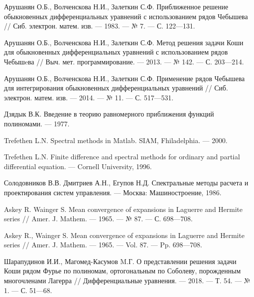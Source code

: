 \begin{thebibliography}{20}
Арушанян О.Б., Волченскова Н.И., Залеткин С.Ф. Приближенное решение обыкновенных дифференциальных уравнений с использованием рядов Чебышева // Сиб. электрон. матем. изв. --- 1983. --- № 7. --- С. 122---131.



Арушанян О.Б., Волченскова Н.И., Залеткин С.Ф. Метод решения задачи Коши для обыкновенных дифференциальных уравнений с использованием рядов Чебышeва // Выч. мет. программирование. --- 2013. --- № 142. --- С. 203---214.



Арушанян О.Б., Волченскова Н.И., Залеткин С.Ф. Применение рядов Чебышева для интегрирования обыкновенных дифференциальных уравнений // Сиб. электрон. матем. изв. --- 2014. --- № 11. --- С. 517---531.



Дзядык В.К. Введение в теорию равномерного приближения функций полиномами. --- 1977.



Trefethen L.N. Spectral methods in Matlab. SIAM, Fhiladelphia. --- 2000.



Trefethen L.N. Finite difference and spectral methods for ordinary and partial differential equation. --- Cornell University, 1996.



Солодовников В.В. Дмитриев А.Н., Егупов Н.Д. Спектральные методы расчета и проектирования систем управления. --- Москва: Машиностроение, 1986.



Askey R. Wainger S. Mean convergence of expansions in Laguerre and Hermite series // Amer. J. Mathem. --- 1965. --- № 87. --- С. 698---708.



Askey R., Wainger S. Mean convergence of expansions in Laguerre and Hermite series // Amer. J. Mathem. --- 1965. --- Vol. 87. --- Pp. 698---708.




Шарапудинов И.И., Магомед-Касумов M.Г. О представлении решения задачи Коши  рядом Фурье  по полиномам, ортогональным по  Соболеву, порожденным многочленами Лагерра // Дифференциальные уравнения. --- 2018. --- Т. 54. --- № 1. --- С. 51---68.




\end{thebibliography}
